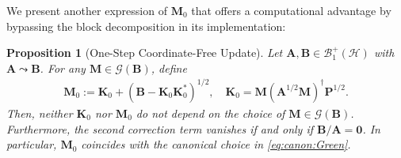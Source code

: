 \documentclass[noinfoline]{imsart}\setcounter{tocdepth}{2}
\newcommand{\m}[1]{\mathbf{#1}}
\renewcommand{\c}[1]{\mathcal{#1}}
\theoremstyle{plain}
\newtheorem{proposition}[theorem]{Proposition}
\begin{document}
We present another expression of $\m{M}_{0}$ that offers a computational advantage by bypassing the block decomposition in its implementation:
\begin{proposition}[One-Step Coordinate-Free Update]\label{prop:one:update}
Let $\m{A}, \m{B} \in \c{B}_{1}^{+}(\c{H})$ with $\m{A} \leadsto \m{B}$. For any $\m{M} \in \c{G}(\m{B})$, define
\begin{align*}
    \m{M}_{0} := \m{K}_{0} + (\m{B} - \m{K}_{0} \m{K}_{0}^{*})^{1/2}, \quad \m{K}_{0} = \m{M} (\m{A}^{1/2} \m{M})^{\dagger} \m{P}^{1/2}.
\end{align*}
Then, neither $\m{K}_{0}$ nor $\m{M}_{0}$ do not depend on the choice of $\m{M} \in \c{G}(\m{B})$. Furthermore, the second correction term vanishes if and only if $\m{B}/\m{A} = \m{0}$. In particular, $\m{M}_{0}$ coincides with the canonical choice in \eqref{eq:canon:Green}. 
\end{proposition}
\end{document}
